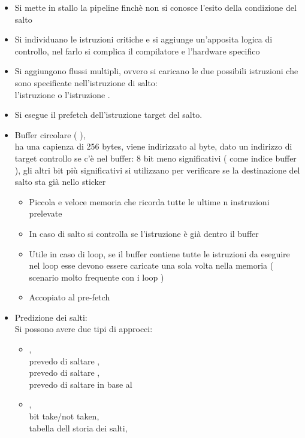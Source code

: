 \documentclass[arch.tex]{subfiles}
\begin{document}
\begin{itemize}
	\item Si mette in stallo la pipeline finchè non si conosce l'esito 
		della condizione del salto
	\item Si individuano le istruzioni critiche e si aggiunge un'apposita logica
		di controllo, nel farlo si complica il compilatore e l'hardware specifico
	\item Si aggiungono flussi multipli, ovvero si caricano le due possibili istruzioni
		che sono specificate nell'istruzione di salto:\\
		l'istruzione  o l'istruzione .
	\item Si esegue il prefetch dell'istruzione target del salto.
	\item Buffer circolare (   ),\\
		ha una capienza di 256 bytes, viene indirizzato al byte, dato un indirizzo di 
		target controllo se c'è nel buffer: 8 bit meno significativi ( come indice 
		buffer ), gli altri bit più significativi si utilizzano per verificare se la 
		destinazione del salto sta già nello sticker
		\begin{itemize}
			\item Piccola e veloce memoria che ricorda tutte le ultime n
				instruzioni prelevate
			\item In caso di salto si controlla se l'istruzione 
				è già dentro il buffer
			\item Utile in caso di loop, se il buffer contiene tutte le istruzioni
				da eseguire nel loop esse devono essere caricate una sola 
				volta nella memoria ( scenario molto frequente con i loop )
			\item Accopiato al pre-fetch 
		\end{itemize}
	\item Predizione dei salti:\\
		Si possono avere due tipi di approcci:
		\begin{itemize}
			\item {},\\
				prevedo di saltare ,\\
				prevedo di  saltare ,\\
				prevedo di saltare in base al  
			\item {},\\
				bit take/not taken,\\
				tabella dell storia dei salti,\\

\end{itemize}
\end{itemize}
\end{document}
